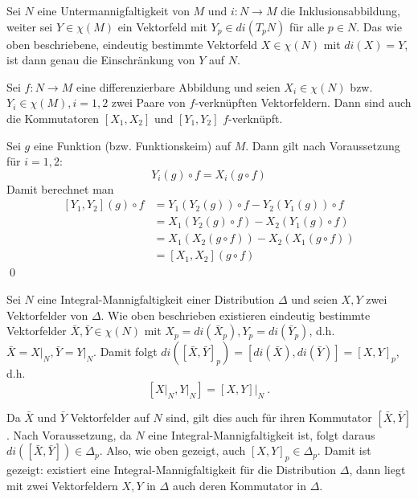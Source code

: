 \documentclass[%
	paper=a5,%
	fleqn,%
	DIV=18,%
	BCOR=0mm,
	fontsize=11pt,
	titlepage=false,%
	bibliography=totoc,
	DIV=18,%
	twoside=true,
	pdftitle=Riemannsche Geometrie,
	pdfauthor=Uwe Semmelmann,
	numbers=noendperiod]%
	{scrbook}
\begin{document}
\begin{ex}
Sei $N$ eine Untermannigfaltigkeit von $M$ und $i:N\rightarrow M$ die Inklusionsabbildung, weiter sei $Y \in \chi(M)$ ein
Vektorfeld mit $Y_p \in di (T_pN)$ f\"ur alle $p \in N$. Das wie oben beschriebene, eindeutig bestimmte Vektorfeld
$X\in \chi(N)$ mit $di(X)=Y$, ist dann genau die Einschr\"ankung von $Y$ auf $N$.\boxc
\end{ex}

\bigskip

\begin{Lemma}\label{kommutator1}
Sei $f: N\rightarrow M$ eine differenzierbare  Abbildung und seien  $X_i \in \chi(N)$ bzw. $Y_i \in \chi(M), i=1,2$
zwei Paare von $f$-verkn\"upften Vektorfeldern. Dann sind auch die Kommutatoren $[X_1, X_2]$ und $[Y_1,Y_2]$
$f$-verkn\"upft.\fish
\end{Lemma}
\proof
Sei $g$ eine Funktion (bzw. Funktionskeim) auf $M$. Dann gilt nach Voraussetzung f\"ur $i=1,2$:
$$
Y_i(g)\circ f = X_i (g\circ f)
$$
Damit berechnet man
$$
\begin{array}{rl}
[Y_1, Y_2](g) \circ f & = Y_1(Y_2(g))\circ f  - Y_2(Y_1(g))\circ f \\[1ex]
& = X_1(Y_2(g) \circ f) - X_2(Y_1(g) \circ f) \\[1ex]
& = X_1(X_2(g\circ f)) - X_2(X_1(g\circ f)) \\[1ex]
& = [X_1, X_2](g\circ f)
\end{array}
$$
\qed

\bigskip

\begin{ex*}[Anwendung]
Sei $N$ eine Integral-Mannigfaltigkeit einer Distribution $\Delta$ und seien $X,Y$
zwei Vektorfelder von $\Delta$. Wie oben beschrieben existieren eindeutig bestimmte
Vektorfelder $\bar X, \bar Y \in \chi(N)$ mit $X_p= di(\bar X_p), Y_p = di(\bar Y_p)$,
d.h. $\bar X = \left. X\right|_N, \bar Y = \left. Y \right|_N$. Damit folgt
$
di([\bar X, \bar Y]_p) = [di(\bar X), di (\bar Y)] = [X, Y]_p
$,
d.h.
$$
[\left. X\right|_N, \left. Y \right|_N] = \left. [X, Y] \right|_N \ .
$$


Da $\bar X$ und $\bar Y$ Vektorfelder auf $N$ sind, gilt dies auch f\"ur
ihren Kommutator $[\bar X, \bar Y]$. Nach Voraussetzung, da $N$ eine
Integral-Mannigfaltigkeit ist, folgt daraus $di ([\bar X, \bar Y])\in \Delta_p$.
Also, wie oben gezeigt, auch $[X, Y]_p \in \Delta_p$. Damit ist gezeigt:
existiert eine Integral-Mannigfaltigkeit f\"ur die Distribution $\Delta$,
dann liegt mit zwei Vektorfeldern $X, Y$ in $\Delta$ auch deren Kommutator
in $\Delta$.\boxc
\end{ex*}
\end{document}
